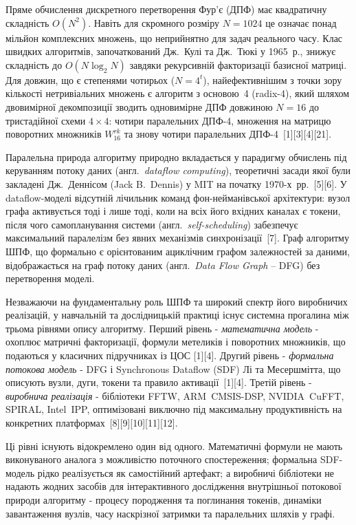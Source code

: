 \documentclass[
]{article}
\begin{document}
Пряме обчислення дискретного перетворення Фур'є (ДПФ) має квадратичну
складність \(O(N^{2})\). Навіть для скромного розміру \(N = 1024\) це
означає понад мільйон комплексних множень, що неприйнятно для задач
реального часу. Клас швидких алгоритмів, започаткований Дж.~Кулі та
Дж.~Тюкі у 1965~р., знижує складність до \(O(N\log_{2}N)\) завдяки
рекурсивній факторизації базисної матриці. Для довжин, що є степенями
чотирьох (\(N = 4^{t}\)), найефективнішим з точки зору кількості
нетривіальних множень є алгоритм з основою~4 (radix-4), який шляхом
двовимірної декомпозиції зводить одновимірне ДПФ довжиною \(N = 16\) до
тристадійної схеми \(4 \times 4\): чотири паралельних ДПФ-4, множення на
матрицю поворотних множників \(W_{16}^{rk}\) та знову чотири паралельних
ДПФ-4~{[}1{]}{[}3{]}{[}4{]}{[}21{]}.

Паралельна природа алгоритму природно вкладається у парадигму обчислень
під керуванням потоку даних (англ.~\emph{dataflow computing}),
теоретичні засади якої були закладені Дж.~Деннісом (Jack B.~Dennis) у
MIT на початку 1970-х~рр.~{[}5{]}{[}6{]}. У dataflow-моделі відсутній
лічильник команд фон-нейманівської архітектури: вузол графа активується
тоді і лише тоді, коли на всіх його вхідних каналах є токени, після чого
самопланування системи (англ.~\emph{self-scheduling}) забезпечує
максимальний паралелізм без явних механізмів синхронізації~{[}7{]}. Граф
алгоритму ШПФ, що формально є орієнтованим ациклічним графом залежностей
за даними, відображається на граф потоку даних (англ.~\emph{Data Flow
Graph} -- DFG) без перетворення моделі.

Незважаючи на фундаментальну роль ШПФ та широкий спектр його виробничих
реалізацій, у навчальній та дослідницькій практиці існує системна
прогалина між трьома рівнями опису алгоритму. Перший рівень -
\emph{математична модель} - охоплює матричні факторизації, формули
метеликів і поворотних множників, що подаються у класичних підручниках
із ЦОС {[}1{]}{[}4{]}. Другий рівень - \emph{формальна потокова модель}
- DFG і Synchronous Dataflow (SDF) Лі та Месершмітта, що описують вузли,
дуги, токени та правило активації~{[}1{]}{[}4{]}. Третій рівень -
\emph{виробнича реалізація} - бібліотеки FFTW, ARM~CMSIS-DSP,
NVIDIA~CuFFT, SPIRAL, Intel~IPP, оптимізовані виключно під максимальну
продуктивність на конкретних
платформах~{[}8{]}{[}9{]}{[}10{]}{[}11{]}{[}12{]}.

Ці рівні існують відокремлено один від одного. Математичні формули не
мають виконуваного аналога з можливістю поточного спостереження;
формальна SDF-модель рідко реалізується як самостійний артефакт; а
виробничі бібліотеки не надають жодних засобів для інтерактивного
дослідження внутрішньої потокової природи алгоритму - процесу породження
та поглинання токенів, динаміки завантаження вузлів, часу наскрізної
затримки та паралельних шляхів у графі.
\end{document}

